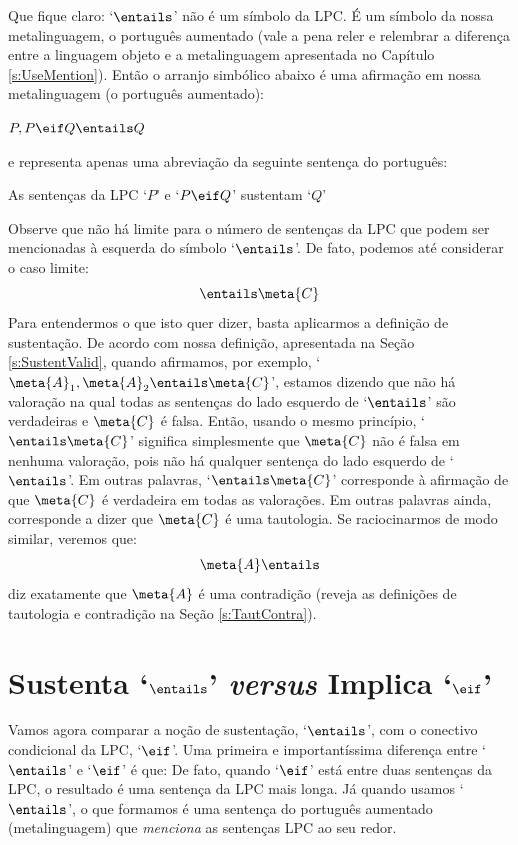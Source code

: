 Que fique claro: `$\entails$' não é um símbolo da LPC.
É um símbolo da nossa metalinguagem, o português aumentado (vale a pena reler e relembrar a diferença entre a linguagem objeto e a metalinguagem apresentada no Capítulo  \ref{s:UseMention}).
Então o arranjo simbólico abaixo é uma afirmação em nossa metalinguagem (o português aumentado):
	\begin{ebullet}
		\item $P, P \eif Q \entails Q$
	\end{ebullet}
e representa apenas uma abreviação da seguinte sentença do português:
	\begin{ebullet}
		\item As sentenças da LPC `$P$' e `$P \eif Q$' sustentam `$Q$'
	\end{ebullet}
Observe que não há limite para o número de sentenças da LPC que podem ser mencionadas à esquerda do símbolo `$\entails$'.
De fato, podemos até considerar o caso limite:
	$$\entails \meta{C}$$
Para entendermos o que isto quer dizer, basta aplicarmos a definição de sustentação.
De acordo com nossa definição, apresentada na Seção \ref{s:SustentValid}, quando afirmamos, por exemplo, `$\meta{A}_1, \meta{A}_2 \entails \meta{C}$', estamos dizendo que não há valoração na qual todas as sentenças do lado esquerdo de `$\entails$' são verdadeiras e $\meta{C}$ é falsa.
Então, usando o mesmo princípio, `$\entails \meta{C}$' significa simplesmente que $\meta{C}$ não é falsa em nenhuma valoração, pois não há qualquer sentença do lado  esquerdo de `$\entails$'.
Em outras palavras, `$\entails \meta{C}$' corresponde à afirmação de que $\meta{C}$ é verdadeira em todas as valorações.
Em outras palavras ainda, corresponde a dizer que $\meta{C}$ é uma tautologia.
Se raciocinarmos de modo similar, veremos que:
	$$\meta{A} \entails$$
diz exatamente que $\meta{A}$ é uma contradição (reveja as definições de tautologia e contradição na Seção \ref{s:TautContra}).


\section[Sustenta \emph{versus} implica]{Sustenta `$\entails$' \emph{versus} Implica `$\eif$'}\label{s:SustVsCond}
Vamos agora comparar a noção de sustentação, `$\entails$', com o conectivo condicional da LPC, `$\eif$'.
Uma primeira e importantíssima diferença entre `$\entails$' e `$\eif$' é que:
{\small
	}
De fato, quando `$\eif$' está entre duas sentenças da LPC, o resultado é uma sentença da LPC mais longa.
Já quando usamos `$\entails$', o que formamos é uma sentença do português aumentado (metalinguagem) que \emph{menciona} as sentenças LPC ao seu redor.

